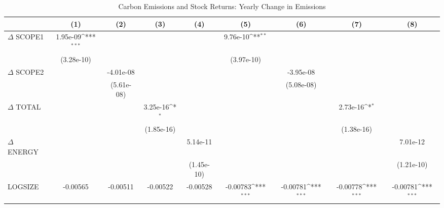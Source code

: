 \begin{table}[htbp]\centering
\def\sym#1{\ifmmode^{#1}\else\(^{#1}\)\fi}
\caption{Carbon Emissions and Stock Returns: Yearly Change in Emissions}
\begin{tabular}{l*{8}{c}}
\hline\hline
                    &\multicolumn{1}{c}{(1)}         &\multicolumn{1}{c}{(2)}         &\multicolumn{1}{c}{(3)}         &\multicolumn{1}{c}{(4)}         &\multicolumn{1}{c}{(5)}         &\multicolumn{1}{c}{(6)}         &\multicolumn{1}{c}{(7)}         &\multicolumn{1}{c}{(8)}         \\
\hline
$\Delta$ SCOPE1     &    1.95e-09\sym{***}&                     &                     &                     &    9.76e-10\sym{**} &                     &                     &                     \\
                    &  (3.28e-10)         &                     &                     &                     &  (3.97e-10)         &                     &                     &                     \\
$\Delta$ SCOPE2     &                     &   -4.01e-08         &                     &                     &                     &   -3.95e-08         &                     &                     \\
                    &                     &  (5.61e-08)         &                     &                     &                     &  (5.08e-08)         &                     &                     \\
$\Delta$ TOTAL      &                     &                     &    3.25e-16\sym{*}  &                     &                     &                     &    2.73e-16\sym{*}  &                     \\
                    &                     &                     &  (1.85e-16)         &                     &                     &                     &  (1.38e-16)         &                     \\
$\Delta$ ENERGY     &                     &                     &                     &    5.14e-11         &                     &                     &                     &    7.01e-12         \\
                    &                     &                     &                     &  (1.45e-10)         &                     &                     &                     &  (1.21e-10)         \\
LOGSIZE             &    -0.00565         &    -0.00511         &    -0.00522         &    -0.00528         &    -0.00783\sym{***}&    -0.00781\sym{***}&    -0.00778\sym{***}&    -0.00781\sym{***}\\

\end{tabular}
\end{table}
